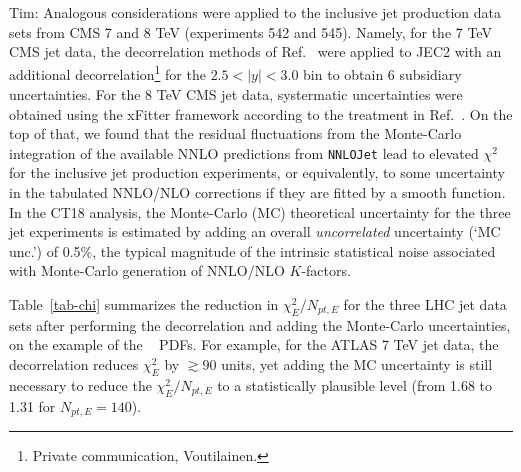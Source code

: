 {\color{red} Tim:
Analogous considerations were applied to the inclusive jet production data sets from CMS 7 and 8 TeV (experiments 542 and 545).  Namely, for the 7 TeV CMS jet data, the decorrelation methods of
Ref.~\cite{Khachatryan:2014waa} were applied to JEC2 with an additional
decorrelation\footnote{Private communication, Voutilainen.} for the $2.5 < |y| < 3.0$ bin to obtain 6 subsidiary uncertainties. For the 8 TeV CMS jet data, systermatic uncertainties
were obtained using the xFitter framework according to the treatment in Ref.~\cite{Khachatryan:2016kdb}.
}
%
On the top of that, we found that the residual fluctuations
from the Monte-Carlo integration of the available NNLO predictions from \texttt{NNLOJet} \cite{Ridder:2015dxa,Gehrmann-DeRidder:2017mvr,Currie:2016bfm,Currie:2017ctp} lead to elevated $\chi^2$ for the inclusive jet production experiments, or equivalently, to some uncertainty in the tabulated NNLO/NLO corrections if they are fitted by a smooth function.   
In the CT18 analysis, the Monte-Carlo (MC) theoretical uncertainty for the three jet experiments is estimated by adding an overall {\it uncorrelated} uncertainty (`MC unc.') of 0.5\%, the typical magnitude of the intrinsic statistical noise associated with Monte-Carlo generation of NNLO/NLO $K$-factors. 
 
Table~\ref{tab-chi} summarizes the reduction in $\chi^2_E/N_{pt,E}$ for the three LHC jet data sets after performing the decorrelation and adding the Monte-Carlo uncertainties, on the example of the \CTHERAII~ PDFs. For example, for the ATLAS 7 TeV jet data, the decorrelation reduces $\chi^2_E$ by $\gtrsim\!\! 90$ units, yet adding the MC uncertainty is still necessary to reduce the $\chi^2_E/N_{pt,E}$ to a statistically plausible level (from 1.68 to 1.31 for $N_{pt,E}=140$). 

